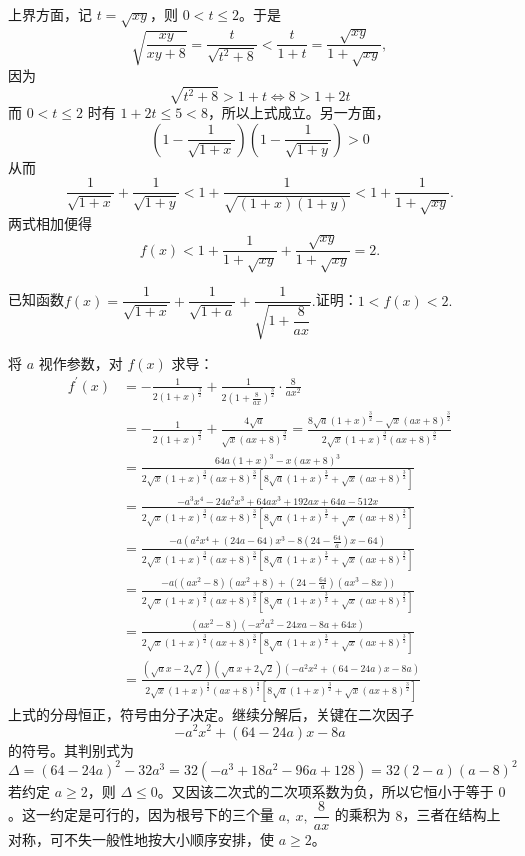 \begin{solution}
上界方面，记 $t=\sqrt{xy}$，则 $0<t\le2$。于是
\[
\sqrt{\frac{xy}{xy+8}}=\frac{t}{\sqrt{t^2+8}}<\frac{t}{1+t}=\frac{\sqrt{xy}}{1+\sqrt{xy}},
\]
因为
\[
\sqrt{t^2+8}>1+t
\iff
8>1+2t
\]
而 \(0<t\le2\) 时有 \(1+2t\le5<8\)，所以上式成立。另一方面，
\[
\left(1-\frac{1}{\sqrt{1+x}}\right)\left(1-\frac{1}{\sqrt{1+y}}\right)>0
\]
从而
\[
\frac{1}{\sqrt{1+x}}+\frac{1}{\sqrt{1+y}}
<
1+\frac{1}{\sqrt{(1+x)(1+y)}}
<
1+\frac{1}{1+\sqrt{xy}}.
\]
两式相加便得
\[
f(x)<1+\frac{1}{1+\sqrt{xy}}+\frac{\sqrt{xy}}{1+\sqrt{xy}}=2.
\]
\end{solution}
\begin{example}[（2008年江西导数压轴）]
已知函数$f \left( x \right)= \dfrac{1}{ \sqrt{1+x}}+ \dfrac{1}{ \sqrt{1+a}}+ \dfrac{1}{ \sqrt{1+ \dfrac{8}{ax}}}.$证明：$1<f(x)<2.$
\end{example}
\begin{solution}
将 $a$ 视作参数，对 $f(x)$ 求导：
\begin{align*}f^{\prime}(x)&=-\frac{1}{2(1+x)^{\frac{3}{2}}}+\frac{1}{2(1+\frac{8}{ax})^{\frac{3}{2}}}\cdot\frac{8}{ax^2}\\&=-\frac{1}{2(1+x)^\frac{3}{2}}+\frac{4\sqrt{a}}{\sqrt{x}(ax+8)^\frac{3}{2}}=\frac{8\sqrt{a}(1+x)^\frac{3}{2}-\sqrt{x}(ax+8)^\frac{3}{2}}{2\sqrt{x}(1+x)^\frac{3}{2}(ax+8)^\frac{3}{2}}\\&=\frac{64a(1+x)^3-x(ax+8)^3}{2\sqrt{x}(1+x)^{\frac{3}{2}}(ax+8)^{\frac{3}{2}}\left[8\sqrt{a}(1+x)^{\frac{3}{2}}+\sqrt{x}(ax+8)^{\frac{3}{2}}\right]}\\&=\frac{-a^3x^4-24a^2x^3+64ax^3+192ax+64a-512x}{2\sqrt{x}(1+x)^{\frac{3}{2}}(ax+8)^{\frac{3}{2}}\left[8\sqrt{a}(1+x)^{\frac{3}{2}}+\sqrt{x}(ax+8)^{\frac{3}{2}}\right]}\\
&=\frac{-a(a^2x^4+(24a-64)x^3-8(24-\frac{64}{a})x-64)}{2\sqrt{x}(1+x)^{\frac{3}{2}}(ax+8)^{\frac{3}{2}}\left[8\sqrt{a}(1+x)^{\frac{3}{2}}+\sqrt{x}(ax+8)^{\frac{3}{2}}\right]}\\
&=\frac{-a\bigg((ax^2-8)(ax^2+8)+(24-\frac{64}{a})(ax^3-8x)\bigg)}{2\sqrt{x}(1+x)^{\frac{3}{2}}(ax+8)^{\frac{3}{2}}\left[8\sqrt{a}(1+x)^{\frac{3}{2}}+\sqrt{x}(ax+8)^{\frac{3}{2}}\right]}\\
&=\frac{\left(ax^{2}-8 \right) \left(-x^{2}a^{2}-24xa-8a+64x \right)}{2\sqrt{x}(1+x)^{\frac{3}{2}}(ax+8)^{\frac{3}{2}}\left[8\sqrt{a}(1+x)^{\frac{3}{2}}+\sqrt{x}(ax+8)^{\frac{3}{2}}\right]}\\
&=\frac{(\sqrt{a}x-2\sqrt2)(\sqrt{a}x+2\sqrt2)(-a^2x^2+(64-24a)x-8a)}{2\sqrt{x}(1+x)^{\frac{3}{2}}(ax+8)^{\frac{3}{2}}\left[8\sqrt{a}(1+x)^{\frac{3}{2}}+\sqrt{x}(ax+8)^{\frac{3}{2}}\right]}
\end{align*}
上式的分母恒正，符号由分子决定。继续分解后，关键在二次因子
\[
-a^2x^2+(64-24a)x-8a
\]
的符号。其判别式为
\[\Delta = (64-24a)^2-32a^3=32(-a^3+18a^2-96a+128)=32(2-a)(a-8)^2\]
若约定 $a\geq 2$，则 $\Delta\leq 0$。又因该二次式的二次项系数为负，所以它恒小于等于 $0$。这一约定是可行的，因为根号下的三个量 $a,\ x,\ \dfrac{8}{ax}$ 的乘积为 $8$，三者在结构上对称，可不失一般性地按大小顺序安排，使 $a\geq 2$。


\end{solution}
